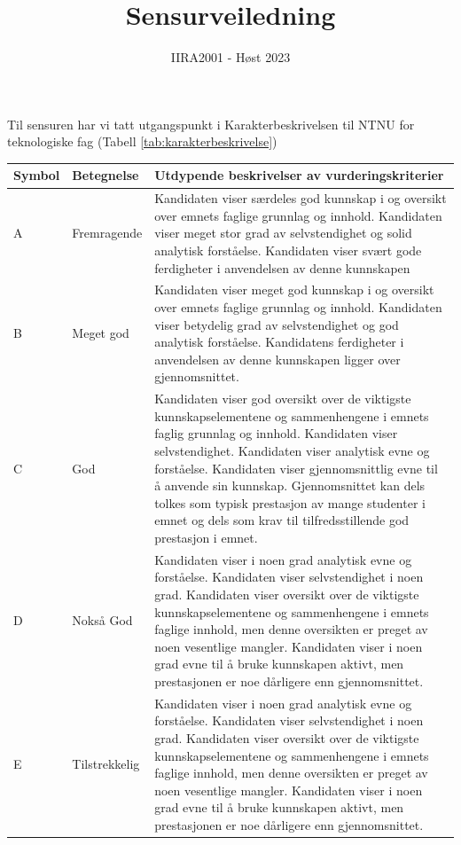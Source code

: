 \documentclass[12pt, titlepage]{article}
\begin{document}
\title{Sensurveiledning}
\author{IIRA2001 - Høst 2023}
\date{}
\maketitle

Til sensuren har vi tatt utgangspunkt i Karakterbeskrivelsen til NTNU for teknologiske fag (Tabell \ref{tab:karakterbeskrivelse})

\begin{table}[h!]
   \footnotesize
   \begin{center}
   \begin{tabular}{|l|l|p{12cm}|}
      \hline
      \textbf{Symbol}   &  \textbf{Betegnelse}  &   \textbf{Utdypende beskrivelser av vurderingskriterier} \\
      \hline
      A & Fremragende & Kandidaten viser særdeles god kunnskap i og oversikt over emnets faglige grunnlag og innhold. Kandidaten viser meget stor grad av selvstendighet og solid analytisk forståelse. Kandidaten viser svært gode ferdigheter i anvendelsen av denne kunnskapen\\
      \hline
      B & Meget god   &Kandidaten viser meget god kunnskap i og oversikt over emnets faglige grunnlag og innhold. Kandidaten viser betydelig grad av selvstendighet og god analytisk forståelse. Kandidatens ferdigheter i anvendelsen av denne kunnskapen ligger over gjennomsnittet.\\
      \hline
      C & God &Kandidaten viser god oversikt over de viktigste kunnskapselementene og sammenhengene i emnets faglig grunnlag og innhold. Kandidaten viser selvstendighet. Kandidaten viser analytisk evne og forståelse. Kandidaten viser gjennomsnittlig evne til å anvende sin kunnskap. Gjennomsnittet kan dels tolkes som typisk prestasjon av mange studenter i emnet og dels som krav til tilfredsstillende god prestasjon i emnet.\\
      \hline
      D & Nokså God &Kandidaten viser i noen grad analytisk evne og forståelse. Kandidaten viser selvstendighet i noen grad. Kandidaten viser oversikt over de viktigste kunnskapselementene og sammenhengene i emnets faglige innhold, men denne oversikten er preget av noen vesentlige mangler. Kandidaten viser i noen grad evne til å bruke kunnskapen aktivt, men prestasjonen er noe dårligere enn gjennomsnittet.\\
      \hline
      E & Tilstrekkelig &Kandidaten viser i noen grad analytisk evne og forståelse. Kandidaten viser selvstendighet i noen grad. Kandidaten viser oversikt over de viktigste kunnskapselementene og sammenhengene i emnets faglige innhold, men denne oversikten er preget av noen vesentlige mangler. Kandidaten viser i noen grad evne til å bruke kunnskapen aktivt, men prestasjonen er noe dårligere enn gjennomsnittet.\\

\end{tabular}
\end{center}
\end{table}
\end{document}
